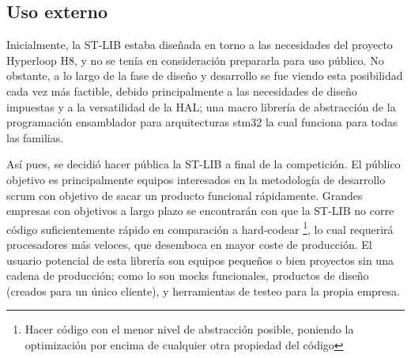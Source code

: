 \documentclass{report}
\begin{document}
\subsection{Uso externo}
Inicialmente, la ST-LIB estaba diseñada en torno a las necesidades del proyecto Hyperloop H8, y no se tenía en consideración prepararla para uso público. No obstante, a lo largo de la fase de diseño y desarrollo se fue viendo esta posibilidad cada vez más factible, debido principalmente a las necesidades de diseño impuestas y a la versatilidad de la HAL; una macro librería de abstracción de la programación ensamblador para arquitecturas stm32 la cual funciona para todas las familias. \par

Así pues, se decidió hacer pública la ST-LIB a final de la competición. El público objetivo es principalmente equipos interesados en la metodología de desarrollo scrum con objetivo de sacar un producto funcional rápidamente. Grandes empresas con objetivos a largo plazo se encontrarán con que la ST-LIB no corre código suficientemente rápido en comparación a hard-codear \footnote{Hacer código con el menor nivel de abstracción posible, poniendo la optimización por encima de cualquier otra propiedad del código}, lo cual requerirá procesadores más veloces, que desemboca en mayor coste de producción. El usuario potencial de esta librería son equipos pequeños o bien proyectos sin una cadena de producción; como lo son mocks funcionales, productos de diseño (creados para un único cliente), y herramientas de testeo para la propia empresa. 
\end{document}
